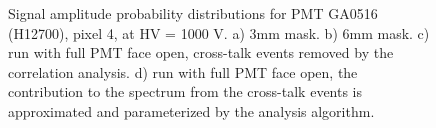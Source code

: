 \begin{figure}[h!bt] 
\centering 
  \caption{Signal amplitude probability distributions for PMT GA0516 (H12700), pixel 4, at HV = 1000 V. a) 3mm mask. b) 6mm mask. c) run with full PMT face open, cross-talk events removed by the correlation analysis. d) run with full PMT face open, the contribution to the spectrum from the cross-talk events is approximated and parameterized by the analysis algorithm.
    }
\label{fig:GA0516_1}
\end{figure}
